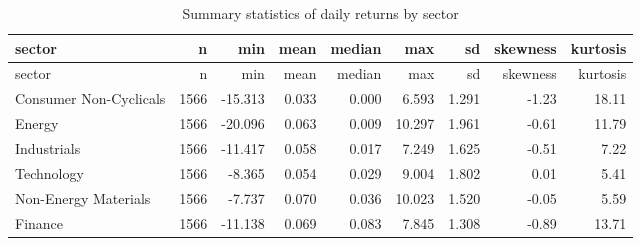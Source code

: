 \documentclass[
  12pt,
  letterpaper,
]{scrbook}
\newenvironment{Shaded}{\begin{snugshade}}{\end{snugshade}}
\newcommand{\AttributeTok}[1]{\textcolor[rgb]{0.40,0.45,0.13}{#1}}
\newcommand{\DecValTok}[1]{\textcolor[rgb]{0.68,0.00,0.00}{#1}}
\newcommand{\FunctionTok}[1]{\textcolor[rgb]{0.28,0.35,0.67}{#1}}
\newcommand{\NormalTok}[1]{\textcolor[rgb]{0.00,0.23,0.31}{#1}}
\newcommand{\OtherTok}[1]{\textcolor[rgb]{0.00,0.23,0.31}{#1}}
\newcommand{\SpecialCharTok}[1]{\textcolor[rgb]{0.37,0.37,0.37}{#1}}
\newcommand{\StringTok}[1]{\textcolor[rgb]{0.13,0.47,0.30}{#1}}
\theoremstyle{plain}
\theoremstyle{definition}
\theoremstyle{remark}
\begin{document}
\begin{Shaded}
\end{Shaded}

\begin{longtable}[]{@{}lrrrrrrrr@{}}
\caption{Summary statistics of daily returns by sector}\tabularnewline
\toprule\noalign{}
sector & n & min & mean & median & max & sd & skewness & kurtosis \\
\midrule\noalign{}
\endfirsthead
\toprule\noalign{}
sector & n & min & mean & median & max & sd & skewness & kurtosis \\
\midrule\noalign{}
\endhead
\bottomrule\noalign{}
\endlastfoot
Consumer Non-Cyclicals & 1566 & -15.313 & 0.033 & 0.000 & 6.593 & 1.291
& -1.23 & 18.11 \\
Energy & 1566 & -20.096 & 0.063 & 0.009 & 10.297 & 1.961 & -0.61 &
11.79 \\
Industrials & 1566 & -11.417 & 0.058 & 0.017 & 7.249 & 1.625 & -0.51 &
7.22 \\
Technology & 1566 & -8.365 & 0.054 & 0.029 & 9.004 & 1.802 & 0.01 &
5.41 \\
Non-Energy Materials & 1566 & -7.737 & 0.070 & 0.036 & 10.023 & 1.520 &
-0.05 & 5.59 \\
Finance & 1566 & -11.138 & 0.069 & 0.083 & 7.845 & 1.308 & -0.89 &
13.71 \\
\end{longtable}
\end{document}
